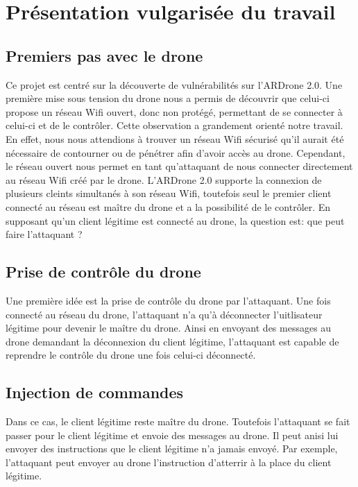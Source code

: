 \section{Présentation vulgarisée du travail}
\subsection{Premiers pas avec le drone}
Ce projet est centré sur la découverte de vulnérabilités sur l'ARDrone 2.0. Une première mise sous tension du drone nous a permis de découvrir que celui-ci propose un réseau Wifi ouvert, donc non protégé, permettant de se connecter à celui-ci et de le contrôler. Cette observation a grandement orienté notre travail. En effet, nous nous attendions à trouver un réseau Wifi sécurisé qu'il aurait été nécessaire de contourner ou de pénétrer afin d'avoir accès au drone. Cependant, le réseau ouvert nous permet en tant qu'attaquant de nous connecter directement au réseau Wifi créé par le drone. L'ARDrone 2.0 supporte la connexion de plusieurs cleints simultanés à son réseau Wifi, toutefois seul le premier client connecté au réseau est maître du drone et a la possibilité de le contrôler. En supposant qu'un client légitime est connecté au drone, la question est: que peut faire l'attaquant ?

\subsection{Prise de contrôle du drone}
Une première idée est la prise de contrôle du drone par l'attaquant. Une fois connecté au réseau du drone, l'attaquant n'a qu'à déconnecter l'uitlisateur légitime pour devenir le maître du drone. Ainsi en envoyant des messages au drone demandant la déconnexion du client légitime, l'attaquant est capable de reprendre le contrôle du drone une fois celui-ci déconnecté.

\subsection{Injection de commandes}
Dans ce cas, le client légitime reste maître du drone. Toutefois l'attaquant se fait passer pour le client légitime et envoie des messages au drone. Il peut anisi lui envoyer des instructions que le client légitime n'a jamais envoyé. Par exemple, l'attaquant peut envoyer au drone l'instruction d'atterrir à la place du client légitime.

